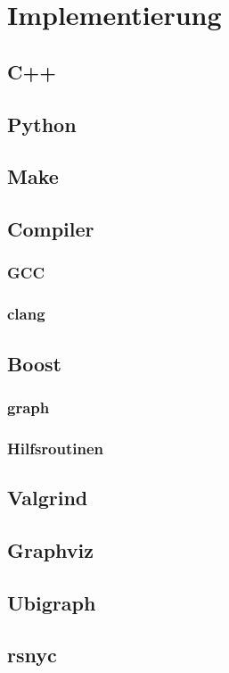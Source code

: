 \section{Implementierung}

\subsection{C++}

\subsection{Python}

\subsection{Make}


\subsection{Compiler}

\subsubsection{GCC}

\subsubsection{clang}

\subsection{Boost}

\subsubsection{graph}

\subsubsection{Hilfsroutinen}

\subsection{Valgrind}

\subsection{Graphviz}

\subsection{Ubigraph}

\subsection{rsnyc}
